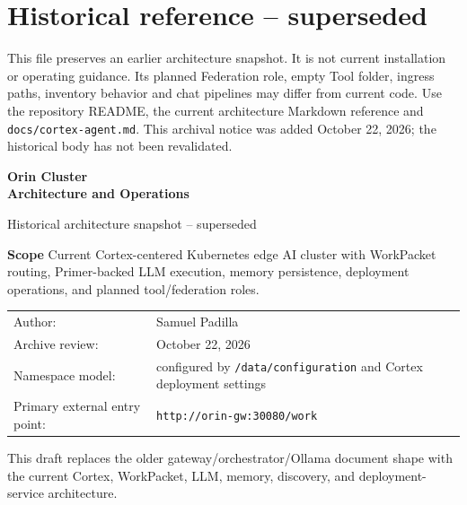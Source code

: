 \documentclass[11pt,a4paper]{article}
\begin{document}
\section*{Historical reference -- superseded}
This file preserves an earlier architecture snapshot. It is not current
installation or operating guidance. Its planned Federation role, empty Tool
folder, ingress paths, inventory behavior and chat pipelines may differ from
current code. Use the repository README, the current architecture Markdown
reference and \texttt{docs/cortex-agent.md}. This archival notice was added
October 22, 2026; the historical body has not been revalidated.


\begin{titlepage}
  \centering
  \vspace*{2.2cm}
  {\fontsize{26}{30}\selectfont\bfseries Orin Cluster\\Architecture and Operations\par}
  \vspace{0.6cm}
  {\large Historical architecture snapshot -- superseded\par}
  \vspace{1.1cm}

  \begin{infobox}
  \textbf{Scope}\newline
  Current Cortex-centered Kubernetes edge AI cluster with WorkPacket routing, Primer-backed LLM execution, memory persistence, deployment operations, and planned tool/federation roles.
  \end{infobox}

  \vspace{0.8cm}
  \begin{tabular}{@{}ll@{}}
  Author: & Samuel Padilla \\
  Archive review: & October 22, 2026 \\
  Namespace model: & configured by \texttt{/data/configuration} and Cortex deployment settings \\
  Primary external entry point: & \texttt{http://orin-gw:30080/work} \\
  \end{tabular}

  \vfill

  \begin{infobox}
  This draft replaces the older gateway/orchestrator/Ollama document shape with the current Cortex, WorkPacket, LLM, memory, discovery, and deployment-service architecture.
  \end{infobox}
\end{titlepage}
\end{document}

